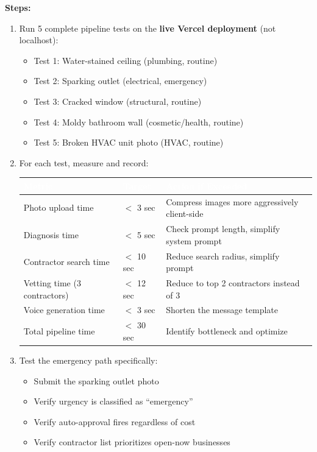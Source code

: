 \documentclass[11pt, a4paper]{article}
\begin{document}
\textbf{Steps:}
\begin{enumerate}[leftmargin=2em, itemsep=2pt]
  \item Run 5 complete pipeline tests on the \textbf{live Vercel deployment} (not localhost):
    \begin{itemize}[itemsep=1pt]
      \item Test 1: Water-stained ceiling (plumbing, routine)
      \item Test 2: Sparking outlet (electrical, emergency)
      \item Test 3: Cracked window (structural, routine)
      \item Test 4: Moldy bathroom wall (cosmetic/health, routine)
      \item Test 5: Broken HVAC unit photo (HVAC, routine)
    \end{itemize}

  \item For each test, measure and record:

\begin{tabularx}{\textwidth}{|l|l|X|}
\hline
\rowcolor{primary}
\textcolor{white}{\textbf{Metric}} & \textcolor{white}{\textbf{Target}} & \textcolor{white}{\textbf{Action if Exceeded}} \\
\hline
Photo upload time & $<$ 3 sec & Compress images more aggressively client-side \\
\hline
Diagnosis time & $<$ 5 sec & Check prompt length, simplify system prompt \\
\hline
Contractor search time & $<$ 10 sec & Reduce search radius, simplify prompt \\
\hline
Vetting time (3 contractors) & $<$ 12 sec & Reduce to top 2 contractors instead of 3 \\
\hline
Voice generation time & $<$ 3 sec & Shorten the message template \\
\hline
Total pipeline time & $<$ 30 sec & Identify bottleneck and optimize \\
\hline
\end{tabularx}

  \item Test the emergency path specifically:
    \begin{itemize}[itemsep=1pt]
      \item Submit the sparking outlet photo
      \item Verify urgency is classified as ``emergency''
      \item Verify auto-approval fires regardless of cost
      \item Verify contractor list prioritizes open-now businesses
    \end{itemize}


\end{enumerate}
\end{document}
